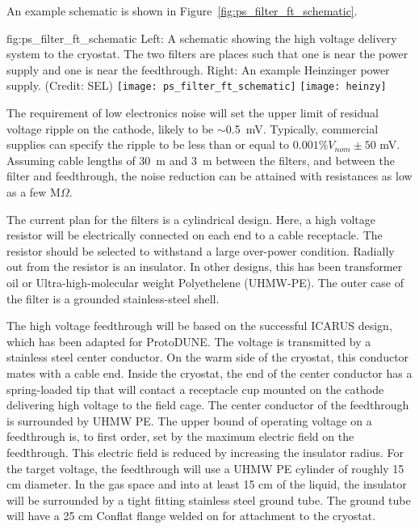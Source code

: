 An example schematic is shown in Figure~\ref{fig:ps_filter_ft_schematic}.

\begin{dunefigure}{fig:ps_filter_ft_schematic}
{Left:  A schematic showing the high voltage delivery system to the cryostat.  The two filters are places such that one is near the power supply and one is near the feedthrough. Right:  An example Heinzinger power supply.  (Credit: SEL)}
\texttt{[image: ps\_filter\_ft\_schematic]}
\texttt{[image: heinzy]}
\end{dunefigure}

The requirement of low electronics noise will set the upper limit of residual voltage ripple on the cathode, likely to be $\sim$\SI{0.5}{mV}.  Typically, commercial supplies can specify the ripple to be less than or equal to $0.001\%V_{nom} \pm 50$ mV.  Assuming cable lengths of \SI{30}{m} and \SI{3}{m} between the filters, and between the filter and feedthrough, the noise reduction can be attained with resistances as low as a few M$\Omega$. 

The current plan for the filters is a cylindrical design.  Here, a high voltage resistor will be electrically connected on each end to a cable receptacle.  The resistor should be selected to withstand a large over-power condition.  Radially out from the resistor is an insulator.  In other designs, this has been transformer oil or Ultra-high-molecular weight Polyethelene (UHMW-PE).  The outer case of the filter is a grounded stainless-steel shell.

The high voltage feedthrough will be based on the successful ICARUS design, which has been adapted for ProtoDUNE.  The voltage is transmitted by a stainless steel center conductor.  On the warm side of the cryostat, this conductor mates with a cable end.  Inside the cryostat, the end of the center conductor has a spring-loaded tip that will contact a receptacle cup mounted on the cathode delivering high voltage to the field cage.  The center conductor of the feedthrough is surrounded by UHMW PE.  The upper bound of operating voltage on a feedthrough is, to first order, set by the maximum electric field on the feedthrough.  This electric field is reduced by increasing the insulator radius.  For the target voltage, the feedthrough will use a UHMW PE cylinder of roughly 15 cm diameter.  In the gas space and into at least 15 cm of the liquid, the insulator will be surrounded by a tight fitting stainless steel ground tube.  The ground tube will have a 25 cm Conflat flange welded on for attachment to the cryostat.

